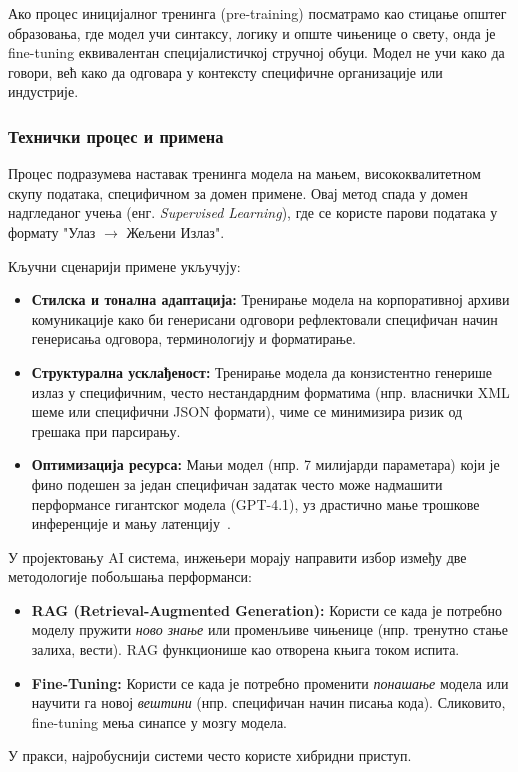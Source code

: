 Ако процес иницијалног тренинга (pre-training) посматрамо као стицање општег образовања, где модел учи синтаксу, логику и опште чињенице о свету, онда је fine-tuning еквивалентан специјалистичкој стручној обуци. Модел не учи како да говори, већ како да одговара у контексту специфичне организације или индустрије.

\subsubsection{Технички процес и примена}
Процес подразумева наставак тренинга модела на мањем, висококвалитетном скупу података, специфичном за домен примене. Овај метод спада у домен надгледаног учења (енг. \textit{Supervised Learning}), где се користе парови података у формату "Улаз $\rightarrow$ Жељени Излаз".

Кључни сценарији примене укључују:
\begin{itemize}
    \item \textbf{Стилска и тонална адаптација:} Тренирање модела на корпоративној архиви комуникације како би генерисани одговори рефлектовали специфичан начин генерисања одговора, терминологију и форматирање.
    \item \textbf{Структурална усклађеност:} Тренирање модела да конзистентно генерише излаз у специфичним, често нестандардним форматима (нпр. власнички XML шеме или специфични JSON формати), чиме се минимизира ризик од грешака при парсирању.
    \item \textbf{Оптимизација ресурса:} Мањи модел (нпр. 7 милијарди параметара) који је фино подешен за један специфичан задатак често може надмашити перформансе гигантског модела (GPT-4.1), уз драстично мање трошкове инференције и мању латенцију~\cite{chen2023frugal,hu2022lora}.
\end{itemize}

\begin{tcolorbox}[colback=green!5!white,colframe=green!75!black,title=Архитектонска дилема: RAG или Fine-Tuning?]
У пројектовању AI система, инжењери морају направити избор између две методологије побољшања перформанси:
\begin{itemize}
    \item \textbf{RAG (Retrieval-Augmented Generation):} Користи се када је потребно моделу пружити \textit{ново знање} или променљиве чињенице (нпр. тренутно стање залиха, вести). RAG функционише као отворена књига током испита.
    \item \textbf{Fine-Tuning:} Користи се када је потребно променити \textit{понашање} модела или научити га новој \textit{вештини} (нпр. специфичан начин писања кода). Сликовито, fine-tuning мења синапсе у мозгу модела.
\end{itemize}
У пракси, најробуснији системи често користе хибридни приступ.
\end{tcolorbox}

